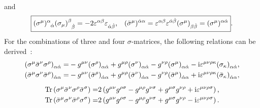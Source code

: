 and 
\begin{equation}
	\begin{aligned}
			\boxed{
		\tensor{(\sigma^{\mu})}{^{\alpha}_{\dot{\alpha}}} \tensor{({\sigma}_{\mu})}{^{\beta}_{\dot{\beta}}} = -2 \tensor{\eps}{^{\alpha \beta}} \tensor{\eps}{_{\dot{\alpha} \dot{\beta}}}
	\text{,} \quad
		\tensor{(\bar{\sigma}^{\mu})}{^{\dot{\alpha} \alpha}} = \tensor{\eps}{^{\alpha \beta}} \tensor{\eps}{^{\dot{\alpha} \dot{\beta}}} \tensor{(\sigma^{\mu})}{_{\beta \dot{\beta}}}
		= \tensor{(\sigma^{\mu})}{^{\alpha \dot{\alpha}}}
	}
	\text{.}
	\end{aligned}
	\label{eq:sigmabarsigma}
\end{equation}
For the combinations of three and four $ \sigma $-matrices, the following relations can be derived~\cite[p.~10]{Dreiner.2010}:
\begin{gather}
		\begin{aligned}
			\tensor{(\sigma^{\mu} \bar{\sigma}^{\nu} \sigma^{\rho})}{_{\alpha \dot{\alpha}}}
			=& - \tensor{\metric}{^{\mu \nu}} \tensor{(\sigma^{\rho})}{_{\alpha \dot{\alpha}}}
			+ \tensor{\metric}{^{\mu \rho}} \tensor{(\sigma^{\nu})}{_{\alpha \dot{\alpha}}}
			- \tensor{\metric}{^{\nu \rho}} \tensor{(\sigma^{\mu})}{_{\alpha \dot{\alpha}}}
			- \mi \tensor{\eps}{^{\mu \nu \rho \kappa}} \tensor{(\sigma_{\kappa})}{_{\alpha \dot{\alpha}}} \text{,}\\
			\tensor{(\bar{\sigma}^{\mu} \sigma^{\nu} \bar{\sigma}^{\rho})}{_{\dot{\alpha} \alpha}}
			=& - \tensor{\metric}{^{\mu \nu}}  \tensor{(\bar{\sigma}^{\rho})}{_{\dot{\alpha} \alpha}}
			+ \tensor{\metric}{^{\mu \rho}} \tensor{(\bar{\sigma}^{\nu})}{_{\dot{\alpha} \alpha}}
			- \tensor{\metric}{^{\nu \rho}} \tensor{(\bar{\sigma}^{\mu})}{_{\dot{\alpha} \alpha}}
			+ \mi \tensor{\eps}{^{\mu \nu \rho \kappa}} \tensor{(\bar{\sigma}_{\kappa})}{_{\dot{\alpha} \alpha}} \text{,}
		\end{aligned} \label{eq:3sigmas} \\[0.5em]
		\begin{aligned}
			\Tr{\sigma^{\mu} \bar{\sigma}^{\nu} \sigma^{\rho} \bar{\sigma}^{\sigma}}
			=& 2 \left(\metric^{\mu \nu} \metric^{\rho \sigma} - \metric^{\mu \rho} \metric^{\nu \sigma} + \metric^{\mu \sigma} \metric^{\nu \rho} + \mi \eps^{\mu \nu \rho \sigma} \right) \text{,} \\
			\Tr{\bar{\sigma}^{\mu} \sigma^{\nu} \bar{\sigma}^{\rho} \sigma^{\sigma}}
			=& 2 \left(\metric^{\mu \nu} \metric^{\rho \sigma} - \metric^{\mu \rho} \metric^{\nu \sigma} + \metric^{\mu \sigma} \metric^{\nu \rho} - \mi \eps^{\mu \nu \rho \sigma} \right)
			\text{.}
		\end{aligned} \label{eq:tr4sigmas}
\end{gather}
